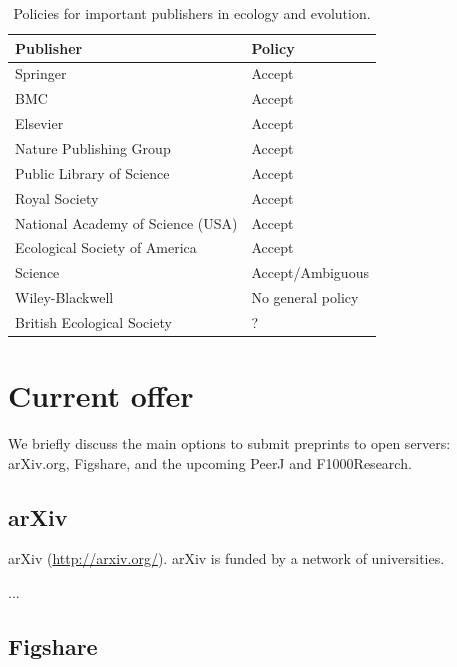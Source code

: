 \documentclass[letterpaper,twocolumn,superscriptaddress,showkeys]{revtex4}
\begin{document}
\begin{table}
    \centering
    \begin{tabular}{|ll|}
    \hline
    Publisher                                   & Policy \\
    \hline
    Springer                            	& Accept \\
    BMC                                 	& Accept \\
    Elsevier                            	& Accept \\
    Nature Publishing Group             	& Accept \\
    Public Library of Science           	& Accept \\
    Royal Society                       	& Accept \\
    National Academy of Science (USA)           & Accept \\
    Ecological Society of America       	& Accept \\ %
    Science                             	& Accept/Ambiguous \\
    Wiley-Blackwell                       	& No general policy \\ %
    British Ecological Society                  & ? \\ %
    \hline
    \end{tabular}
    \caption{Policies for important publishers in ecology and evolution.}
    \label{table:policies}
\end{table}

\section{Current offer}

We briefly discuss the main options to submit preprints to open servers:
arXiv.org, Figshare, and the upcoming PeerJ and F1000Research.

\subsection{arXiv}

arXiv (\href{http://arxiv.org/}{http://arxiv.org/}).
arXiv is funded by a network of universities.

...


\subsection{Figshare}
\end{document}
